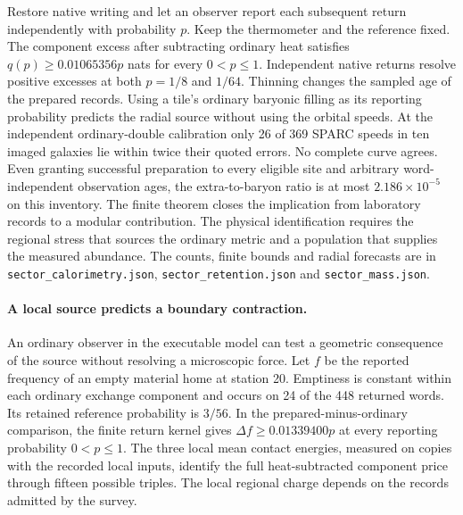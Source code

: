 \documentclass[11pt]{article}
\begin{document}
Restore native writing and let an observer report each subsequent
return independently with probability \(p\). Keep the thermometer and
the reference fixed. The component excess after subtracting ordinary heat
satisfies \(q(p)\geq0.01065356p\) nats for every \(0<p\leq1\).
Independent native returns resolve positive excesses at both \(p=1/8\)
and \(1/64\). Thinning changes the sampled age of the prepared records.
Using a tile's ordinary baryonic filling as its reporting probability
predicts the radial source without using the orbital speeds. At the
independent ordinary-double calibration only 26 of 369 SPARC speeds
in ten imaged galaxies lie within twice their quoted errors. No
complete curve agrees. Even granting successful preparation to every
eligible site and arbitrary word-independent observation ages, the
extra-to-baryon ratio is at most \(2.186\times10^{-5}\) on this
inventory. The finite theorem closes the implication from laboratory
records to a modular contribution. The physical identification requires
the regional stress that sources the ordinary metric and a population
that supplies the measured abundance. The counts, finite bounds and radial forecasts
are in \texttt{sector\_calorimetry.json}, \texttt{sector\_retention.json}
and \texttt{sector\_mass.json}.

\paragraph{A local source predicts a boundary contraction.}
An ordinary observer in the executable model can test a geometric
consequence of the source without resolving a microscopic force.
Let \(f\) be the reported frequency of an empty material home at
station 20. Emptiness is constant within each ordinary exchange
component and occurs on 24 of the 448 returned words. Its retained
reference probability is \(3/56\). In the prepared-minus-ordinary
comparison, the finite return kernel gives
\(\Delta f\ge 0.01339400p\) at every reporting probability
\(0<p\le1\). The three local mean contact energies, measured on
copies with the recorded local inputs, identify the full
heat-subtracted component price through fifteen possible triples.
The local regional charge depends on the records admitted by the survey.
\end{document}

